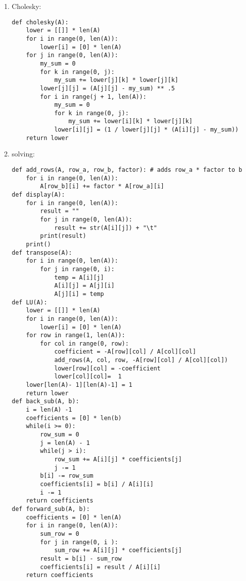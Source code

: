 \documentclass{article}
\begin{document}
\begin{enumerate}
\item Cholesky:
\begin{lstlisting}
def cholesky(A):
    lower = [[]] * len(A)
    for i in range(0, len(A)):
        lower[i] = [0] * len(A)
    for j in range(0, len(A)):
        my_sum = 0
        for k in range(0, j):
            my_sum += lower[j][k] * lower[j][k]
        lower[j][j] = (A[j][j] - my_sum) ** .5
        for i in range(j + 1, len(A)):
            my_sum = 0
            for k in range(0, j):
                my_sum += lower[i][k] * lower[j][k]
            lower[i][j] = (1 / lower[j][j] * (A[i][j] - my_sum))
    return lower
\end{lstlisting}
\item solving: \\
\begin{lstlisting}
def add_rows(A, row_a, row_b, factor): # adds row_a * factor to b
    for i in range(0, len(A)):
        A[row_b][i] += factor * A[row_a][i]
def display(A):
    for i in range(0, len(A)):
        result = ""
        for j in range(0, len(A)):
            result += str(A[i][j]) + "\t"
        print(result)
    print()
def transpose(A):
    for i in range(0, len(A)):
        for j in range(0, i):
            temp = A[i][j]
            A[i][j] = A[j][i]
            A[j][i] = temp
def LU(A):
    lower = [[]] * len(A)
    for i in range(0, len(A)):
        lower[i] = [0] * len(A)
    for row in range(1, len(A)):
        for col in range(0, row):
            coefficient = -A[row][col] / A[col][col]
            add_rows(A, col, row, -A[row][col] / A[col][col])
            lower[row][col] = -coefficient
            lower[col][col]=  1
    lower[len(A)- 1][len(A)-1] = 1
    return lower
def back_sub(A, b):
    i = len(A) -1 
    coefficients = [0] * len(b)
    while(i >= 0):
        row_sum = 0
        j = len(A) - 1
        while(j > i):
            row_sum += A[i][j] * coefficients[j]
            j -= 1
        b[i] -= row_sum
        coefficients[i] = b[i] / A[i][i]
        i -= 1
    return coefficients
def forward_sub(A, b):
    coefficients = [0] * len(A)
    for i in range(0, len(A)):
        sum_row = 0
        for j in range(0, i ):
            sum_row += A[i][j] * coefficients[j]
        result = b[i] - sum_row
        coefficients[i] = result / A[i][i]
    return coefficients


\end{lstlisting}
\end{enumerate}
\end{document}
